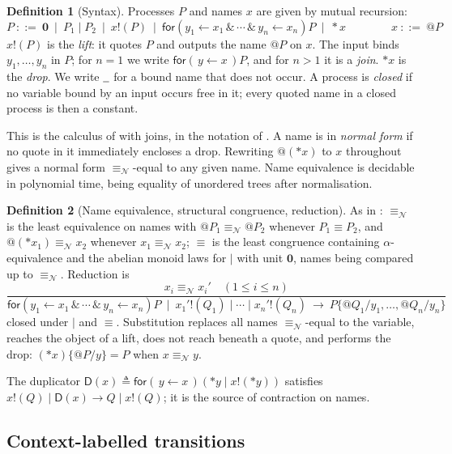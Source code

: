 \documentclass[11pt]{article}
\makeatletter
\theoremstyle{definition}
\newtheorem{definition}{Definition}[section]
\theoremstyle{plain}
\theoremstyle{remark}
\newcommand{\quo}[1]{@#1}
\newcommand{\drp}[1]{{*}#1}
\newcommand{\inp}[3]{\mathsf{for}(\,#1 \leftarrow #2\,)#3}
\newcommand{\out}[2]{#1!(#2)}
\newcommand{\nequiv}{\equiv_{\mathcal{N}}}
\newcommand{\nil}{\mathbf{0}}
\newcommand{\wild}{\mathord{\underline{\hspace{0.5em}}}}
\newcommand{\Dup}{\mathsf{D}}
\makeatother
\begin{document}
\begin{definition}[Syntax]
Processes $P$ and names $x$ are given by mutual recursion:
\[
P \ ::=\ \nil \ \mid\ P_1 \mid P_2 \ \mid\ \out{x}{P}
   \ \mid\ \mathsf{for}(y_1 \leftarrow x_1 \,\&\, \cdots \,\&\, y_n \leftarrow x_n)P
   \ \mid\ \drp{x}
\qquad\qquad
x \ ::=\ \quo{P}
\]
$\out{x}{P}$ is the \emph{lift}: it quotes $P$ and outputs the name
$\quo{P}$ on $x$. The input binds $y_1,\dots,y_n$ in $P$; for $n = 1$ we
write $\inp{y}{x}{P}$, and for $n > 1$ it is a \emph{join}. $\drp{x}$ is
the \emph{drop}. We write $\wild$ for a bound name that does not occur.
A process is \emph{closed} if no variable bound by an input occurs free in
it; every quoted name in a closed process is then a constant.
\end{definition}

This is the calculus of \cite{MeredithRadestock05} with joins, in the
notation of \cite{NWNS}. A name is in \emph{normal form} if no quote in it
immediately encloses a drop. Rewriting $\quo{(\drp{x})}$ to $x$
throughout gives a normal form $\nequiv$-equal to any given name. Name
equivalence is decidable in polynomial time, being equality of unordered
trees after normalisation.

\begin{definition}[Name equivalence, structural congruence, reduction]
As in \cite{NWNS}: $\nequiv$ is the least equivalence on names with
$\quo{P_1} \nequiv \quo{P_2}$ whenever $P_1 \equiv P_2$, and
$\quo{(\drp{x_1})} \nequiv x_2$ whenever $x_1 \nequiv x_2$; $\equiv$ is
the least congruence containing $\alpha$-equivalence and the abelian
monoid laws for $\mid$ with unit $\nil$, names being compared up to
$\nequiv$. Reduction is
\[
\frac{x_i \nequiv x_i' \quad (1 \le i \le n)}
     {\mathsf{for}(y_1 \leftarrow x_1 \,\&\, \cdots \,\&\, y_n \leftarrow x_n)P
      \ \mid\ \out{x_1'}{Q_1} \mid \cdots \mid \out{x_n'}{Q_n}
      \ \to\ P\{\quo{Q_1}/y_1, \dots, \quo{Q_n}/y_n\}}
\]
closed under $\mid$ and $\equiv$. Substitution replaces all names
$\nequiv$-equal to the variable, reaches the object of a lift, does not
reach beneath a quote, and performs the drop:
$(\drp{x})\{\quo{P}/y\} = P$ when $x \nequiv y$.
\end{definition}

The duplicator $\Dup(x) \triangleq \inp{y}{x}{(\drp{y} \mid
\out{x}{\drp{y}})}$ satisfies $\out{x}{Q} \mid \Dup(x) \to Q \mid
\out{x}{Q}$; it is the source of contraction on names.

\subsection{Context-labelled transitions}
\end{document}
